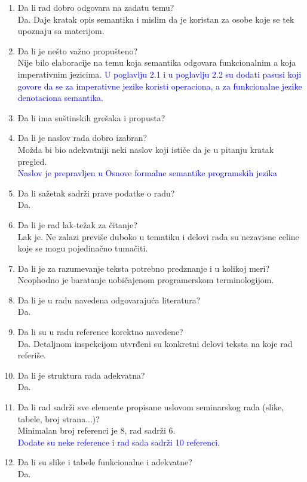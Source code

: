 \documentclass[a4paper]{report}
\newcommand{\odgovor}[1]{\textcolor{blue}{#1}}
\begin{document}
\begin{enumerate}
\item Da li rad dobro odgovara na zadatu temu?\\
Da. Daje kratak opis semantika i mislim da je koristan za osobe koje se tek upoznaju sa materijom.
\item Da li je nešto važno propušteno?\\
Nije bilo elaboracije na temu koja semantika odgovara funkcionalnim a koja imperativnim jezicima. 
\odgovor{U poglavlju 2.1 i u poglavlju 2.2 su dodati pasusi koji govore da se za imperativne jezike koristi operaciona, a za funkcionalne jezike denotaciona semantika.}
\item Da li ima suštinskih grešaka i propusta?\\
\item Da li je naslov rada dobro izabran?\\
Možda bi bio adekvatniji neki naslov koji ističe da je u pitanju kratak pregled.\\
\odgovor{Naslov je prepravljen u Osnove formalne semantike programskih jezika}
\item Da li sažetak sadrži prave podatke o radu?\\
Da.
\item Da li je rad lak-težak za čitanje?\\
Lak je. Ne zalazi previše duboko u tematiku i delovi rada su nezavisne celine koje se mogu pojedinačno tumačiti.
\item Da li je za razumevanje teksta potrebno predznanje i u kolikoj meri?\\
Neophodno je baratanje uobičajenom programerskom terminologijom.
\item Da li je u radu navedena odgovarajuća literatura?\\
Da.
\item Da li su u radu reference korektno navedene?\\
Da. Detaljnom inspekcijom utvrđeni su konkretni delovi teksta na koje rad referiše.
\item Da li je struktura rada adekvatna?\\
Da.
\item Da li rad sadrži sve elemente propisane uslovom seminarskog rada (slike, tabele, broj strana...)?\\
Minimalan broj referenci je 8, rad sadrži 6.\\
\odgovor{Dodate su neke reference i rad sada sadrži 10 referenci.}
\item Da li su slike i tabele funkcionalne i adekvatne?\\
Da.
\end{enumerate}
\end{document}
